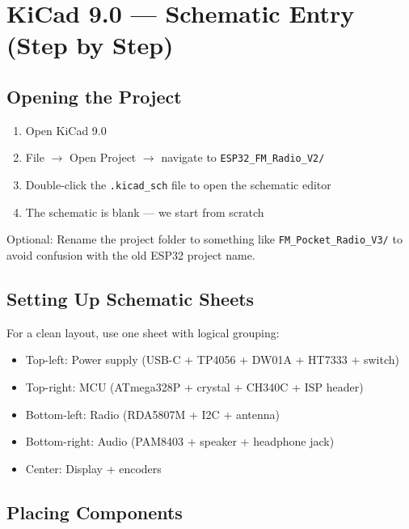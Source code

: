 \documentclass[a4paper,11pt]{article}
\renewcommand*{\,}{ }%
\begin{document}
\section{KiCad 9.0 --- Schematic Entry (Step by Step)}
\label{sec:kicad-sch}

\subsection{Opening the Project}

\begin{enumerate}
    \item Open KiCad 9.0
    \item File $\rightarrow$ Open Project $\rightarrow$ navigate to \texttt{ESP32\_FM\_Radio\_V2/}
    \item Double-click the \texttt{.kicad\_sch} file to open the schematic editor
    \item The schematic is blank --- we start from scratch
\end{enumerate}

\begin{infobox}
Optional: Rename the project folder to something like \texttt{FM\_Pocket\_Radio\_V3/} to avoid confusion with the old ESP32 project name.
\end{infobox}

\subsection{Setting Up Schematic Sheets}

For a clean layout, use one sheet with logical grouping:
\begin{itemize}[noitemsep]
    \item Top-left: Power supply (USB-C + TP4056 + DW01A + HT7333 + switch)
    \item Top-right: MCU (ATmega328P + crystal + CH340C + ISP header)
    \item Bottom-left: Radio (RDA5807M + I2C + antenna)
    \item Bottom-right: Audio (PAM8403 + speaker + headphone jack)
    \item Center: Display + encoders
\end{itemize}

\subsection{Placing Components}
\end{document}
